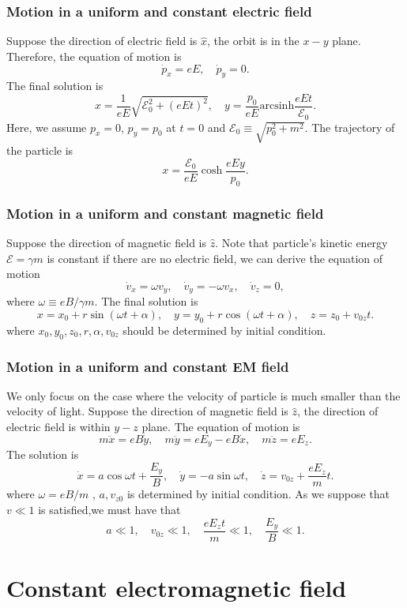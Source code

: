 \subsubsection{Motion in a uniform and constant electric field}
Suppose the direction of electric field is  $\hat{x}$, the orbit is in the $x-y$ plane. Therefore, the equation of motion is
\[\dot{p}_x = eE , \quad \dot{p}_y = 0.\]
The final solution is
\[x = \frac{1}{eE}\sqrt{\mathcal{E}_0^2 + (eEt)^2} , \quad y = \frac{p_0}{eE} \mathrm{arcsinh} \frac{eEt}{\mathcal{E}_0}.\]
Here, we assume $p_x = 0$, $p_y=p_0$ at $t = 0$ and $\mathcal{E}_0 \equiv \sqrt{p_0^2+m^2}$.
The trajectory of the particle is
\[x = \frac{\mathcal{E}_0}{eE}\cosh \frac{eEy}{p_0}.\]

\subsubsection{Motion in a uniform and constant magnetic field}
Suppose the direction of magnetic field is $\hat{z}$. Note that particle's kinetic energy $\mathcal{E} = \gamma m$ is constant if there are no electric field, we can derive the equation of motion
\[\dot{v}_x = \omega v_y , \quad \dot{v}_y = -\omega v_x , \quad \dot{v}_z = 0,\]
where $\omega \equiv {eB}/{\gamma m}$. The final solution is
\[x = x_0 + r\sin(\omega t + \alpha) , \quad y = y_0 + r\cos(\omega t + \alpha) , \quad z = z_0 + v_{0z}t.\]
where $x_0,y_0,z_0,r,\alpha,v_{0z}$ should be determined by initial condition.

\subsubsection{Motion in a uniform and constant EM field}
We only focus on the case where the velocity of particle is much smaller than the velocity of light. 
Suppose the direction of magnetic field is $\hat{z}$, the direction of electric field is within $y-z$ plane. The equation of motion is
\[m\ddot{x} = eB\dot{y} , \quad m\ddot{y} =eE_y - eB\dot{x} , \quad m\ddot{z}=eE_z.\]
The solution is
\[\dot{x} = a \cos \omega t + \frac{E_y}{B} , \quad \dot{y} = -a\sin \omega t , \quad \dot{z} = v_{0z} + \frac{eE_z}{m}t.\]
where $\omega = {eB}/{m}$ , $a,v_{z0}$ is determined by initial condition. As we suppose that $v \ll 1$ is satisfied,we must have that
\[a \ll 1 , \quad v_{0z} \ll 1 , \quad \frac{eE_z t}{m} \ll 1 , \quad \frac{E_y}{B} \ll 1.\]

\section{Constant electromagnetic field}
